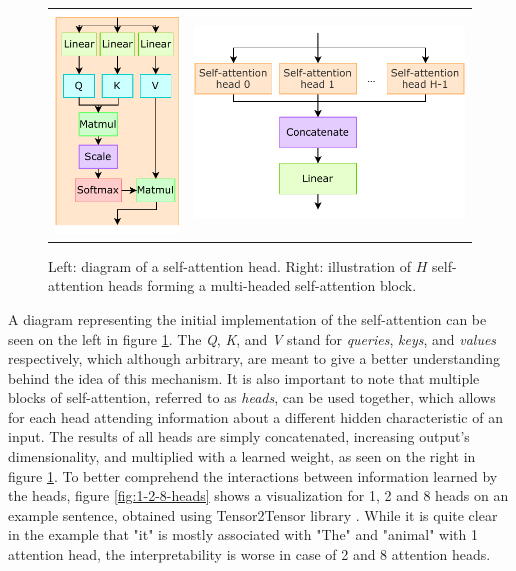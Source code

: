 \begin{figure}[!hpt]
  \centering
  \begin{tabular}{cc}
      {\includegraphics[width=0.2\columnwidth]{background/self_attention.pdf}} &
      {\includegraphics[width=0.4\columnwidth]{background/multi_head_self_attention.pdf}}
  \end{tabular}
  \caption{Left: diagram of a self-attention head. Right: illustration of \(H\) self-attention heads forming a multi-headed self-attention block.}
  \label{fig:self-attention-multi-head}
\end{figure}

A diagram representing the initial implementation of the self-attention can be seen on the left in figure \ref{fig:self-attention-multi-head}. The \textit{Q}, \textit{K}, and \textit{V} stand for \textit{queries}, \textit{keys}, and \textit{values} respectively, which although arbitrary, are meant to give a better understanding behind the idea of this mechanism. It is also important to note that multiple blocks of self-attention, referred to as \textit{heads}, can be used together, which allows for each head attending information about a different hidden characteristic of an input. The results of all heads are simply concatenated, increasing output's dimensionality, and multiplied with a learned weight, as seen on the right in figure \ref{fig:self-attention-multi-head}. To better comprehend the interactions between information learned by the heads, figure \ref{fig:1-2-8-heads} shows a visualization for 1, 2 and 8 heads on an example sentence, obtained using Tensor2Tensor library \cite{tensor2tensor,73-alammarillustrated}. While it is quite clear in the example that "it" is mostly associated with "The" and "animal" with 1 attention head, the interpretability is worse in case of 2 and 8 attention heads.

